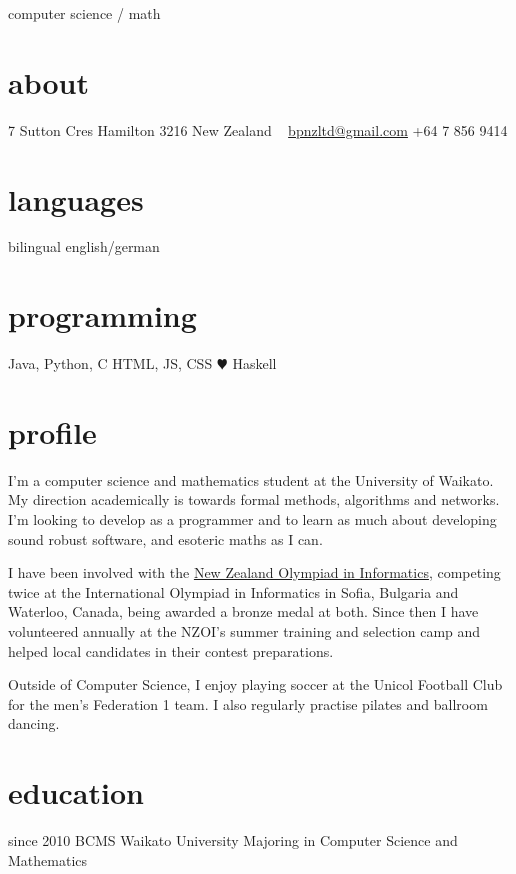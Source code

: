 \documentclass[]{boris-cv}
\begin{document}
       {computer science / math}

\begin{aside}
  \section{about}
    7 Sutton Cres
    Hamilton 3216
    New Zealand
    ~
    \href{mailto:bpnzltd@gmail.com}{bpnzltd@gmail.com}
    +64 7 856 9414
  \section{languages}
    bilingual english/german
  \section{programming}
    Java, Python, C
    HTML, JS, CSS
    {\color{red} $\varheartsuit$} Haskell
\end{aside}

\section{profile}

I'm a computer science and mathematics student at the University of Waikato.
My direction academically is towards formal methods, algorithms and networks.
I'm looking to develop as a programmer and to learn as much about developing
sound robust software, and esoteric maths as I can.

I have been involved with the \href{http://www.nzoi.org.nz/}
{New Zealand Olympiad in Informatics}, competing twice at the International
Olympiad in Informatics in Sofia, Bulgaria and Waterloo, Canada, being
awarded a bronze medal at both. Since then I have volunteered annually at the
NZOI's summer training and selection camp and helped local candidates in
their contest preparations.

Outside of Computer Science, I enjoy playing soccer at the Unicol Football
Club for the men's Federation 1 team. I also regularly practise pilates and
ballroom dancing.

\section{education}

\begin{entrylist}
  \entry
    {since 2010}
    {BCMS }
    {Waikato University}
    {Majoring in Computer Science and Mathematics}
\end{entrylist}
\end{document}

